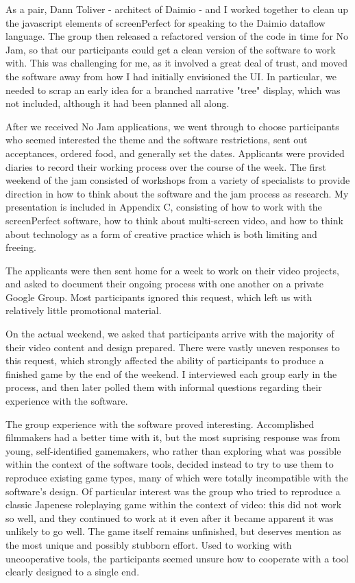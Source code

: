 As a pair, Dann Toliver - architect of Daimio - and I worked together to clean up the javascript elements of screenPerfect for speaking to the Daimio dataflow language. The group then released a refactored version of the code in time for No Jam, so that our participants could get a clean version of the software to work with. This was challenging for me, as it involved a great deal of trust, and moved the software away from how I had initially envisioned the UI. In particular, we needed to scrap an early idea for a branched narrative "tree" display, which was not included, although it had been planned all along.

After we received No Jam applications, we went through to choose participants who seemed interested the theme and the software restrictions, sent out acceptances, ordered food, and generally set the dates. Applicants were provided diaries to record their working process over the course of the week. The first weekend of the jam consisted of workshops from a variety of specialists to provide direction in how to think about the software and the jam process as research. My presentation is included in Appendix C, consisting of how to work with the screenPerfect software, how to think about multi-screen video, and how to think about technology as a form of creative practice which is both limiting and freeing. 

The applicants were then sent home for a week to work on their video projects, and asked to document their ongoing process with one another on a private Google Group. Most participants ignored this request, which left us with relatively little promotional material.

On the actual weekend, we asked that participants arrive with the majority of their video content and design prepared. There were vastly uneven responses to this request, which strongly affected the ability of participants to produce a finished game by the end of the weekend. I interviewed each group early in the process, and then later polled them with informal questions regarding their experience with the software.

The group experience with the software proved interesting. Accomplished filmmakers had a better time with it, but the most suprising response was from young, self-identified gamemakers, who rather than exploring what was possible within the context of the software tools, decided instead to try to use them to reproduce existing game types, many of which were totally incompatible with the software's design. Of particular interest was the group who tried to reproduce a classic Japenese roleplaying game within the context of video: this did not work so well, and they continued to work at it even after it became apparent it was unlikely to go well. The game itself remains unfinished, but deserves mention as the most unique and possibly stubborn effort. Used to working with uncooperative tools, the participants seemed unsure how to cooperate with a tool clearly designed to a single end.

